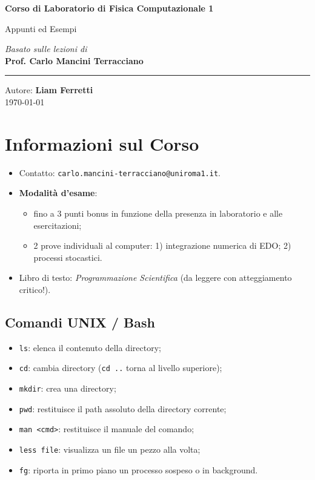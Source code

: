 \documentclass[11pt, a4paper, openright]{book}
\theoremstyle{plain}
\theoremstyle{definition}
\theoremstyle{remark}
\begin{document}
\begin{titlepage}
    \centering
    \vspace*{4cm}

    \Huge
    \textbf{Corso di Laboratorio di Fisica Computazionale 1}

    \vspace{0.5cm}
    \LARGE
    Appunti ed Esempi

    \vspace{1.5cm}

    \textit{Basato sulle lezioni di} \\
    \Large \textbf{Prof. Carlo Mancini Terracciano}

    \vfill

    \rule{\linewidth}{0.5pt}
    \vspace{0.5cm}

    \large
    Autore: \textbf{Liam Ferretti} \\
    \today

\end{titlepage}

\tableofcontents

\chapter{Informazioni sul Corso}
\begin{itemize}
    \item Contatto: \texttt{carlo.mancini-terracciano@uniroma1.it}.
    \item \textbf{Modalità d'esame}:
    \begin{itemize}
        \item fino a 3 punti bonus in funzione della presenza in laboratorio e alle esercitazioni;
        \item 2 prove individuali al computer: 1) integrazione numerica di EDO; 2) processi stocastici.
    \end{itemize}
    \item Libro di testo: \emph{Programmazione Scientifica} (da leggere con atteggiamento critico!).
\end{itemize}

\section{Comandi UNIX / Bash}
\begin{itemize}
    \item \texttt{ls}: elenca il contenuto della directory;
    \item \texttt{cd}: cambia directory (\texttt{cd ..} torna al livello superiore);
    \item \texttt{mkdir}: crea una directory;
    \item \texttt{pwd}: restituisce il path assoluto della directory corrente;
    \item \texttt{man <cmd>}: restituisce il manuale del comando;
    \item \texttt{less file}: visualizza un file un pezzo alla volta;
    \item \texttt{fg}: riporta in primo piano un processo sospeso o in background.
\end{itemize}
\end{document}
